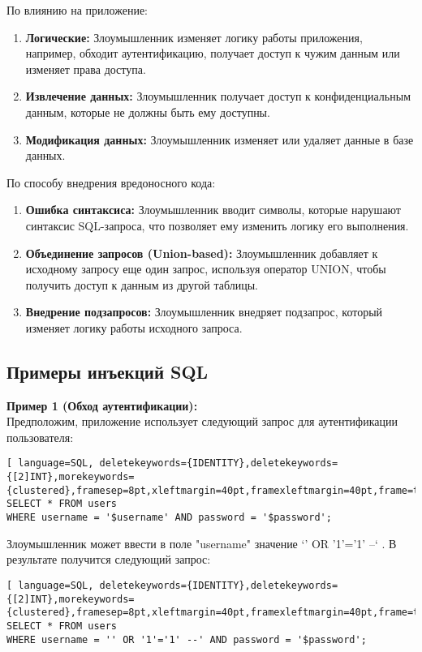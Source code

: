 \documentclass[a4paper,12pt]{diplom}
\begin{document}
	По влиянию на приложение:
	\begin{enumerate}[label=\arabic{enumi})]
		\item \textbf{Логические: }
		Злоумышленник изменяет логику работы приложения, например, обходит аутентификацию, получает доступ к чужим данным или изменяет права доступа.
		\item \textbf{Извлечение данных: }
		Злоумышленник получает доступ к конфиденциальным данным, которые не должны быть ему доступны.
		\item \textbf{Модификация данных: }
		Злоумышленник изменяет или удаляет данные в базе данных.
	\end{enumerate}
	
	По способу внедрения вредоносного кода:
	\begin{enumerate}[label=\arabic{enumi})]
		\item \textbf{Ошибка синтаксиса: }
		Злоумышленник вводит символы, которые нарушают синтаксис SQL-запроса, что позволяет ему изменить логику его выполнения. 
		\item \textbf{Объединение запросов (Union-based): }
		Злоумышленник добавляет к исходному запросу еще один запрос, используя оператор UNION, чтобы получить доступ к данным из другой таблицы.
		\item \textbf{Внедрение подзапросов: }
		Злоумышленник внедряет подзапрос, который изменяет логику работы исходного запроса. 
	\end{enumerate}
	
	
	
	\subsection{Примеры инъекций SQL}
	
	\textbf{Пример 1 (Обход аутентификации):}\\
	Предположим, приложение использует следующий запрос для аутентификации пользователя:
	\begin{lstlisting}[ language=SQL, deletekeywords={IDENTITY},deletekeywords={[2]INT},morekeywords={clustered},framesep=8pt,xleftmargin=40pt,framexleftmargin=40pt,frame=tb,framerule=0pt]		
SELECT * FROM users 
WHERE username = '$username' AND password = '$password';
	\end{lstlisting}
	
	Злоумышленник может ввести в поле "username" значение `' OR '1'='1' --` .  В результате получится следующий запрос: 
	\begin{lstlisting}[ language=SQL, deletekeywords={IDENTITY},deletekeywords={[2]INT},morekeywords={clustered},framesep=8pt,xleftmargin=40pt,framexleftmargin=40pt,frame=tb,framerule=0pt]		
SELECT * FROM users 
WHERE username = '' OR '1'='1' --' AND password = '$password';
	\end{lstlisting}
	
\end{document}
